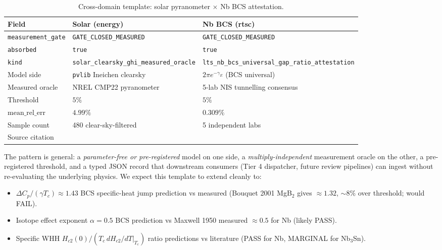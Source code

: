 \documentclass[11pt,a4paper]{article}
\newcommand{\gateclosedmeas}{\texttt{GATE\_CLOSED\_MEASURED}}
\begin{document}
\begin{table}[h]
\centering
\caption{Cross-domain template: solar pyranometer $\times$ Nb BCS attestation.}
\label{tab:cross-domain}
\small
\begin{tabular}{lll}
\toprule
Field & Solar (energy) & Nb BCS (rtsc) \\
\midrule
\texttt{measurement\_gate} & \gateclosedmeas & \gateclosedmeas \\
\texttt{absorbed} & \texttt{true} & \texttt{true} \\
\texttt{kind} & \texttt{solar\_clearsky\_ghi\_measured\_oracle}
        & \texttt{lts\_nb\_bcs\_universal\_gap\_ratio\_attestation} \\
Model side & \texttt{pvlib} Ineichen clearsky
        & \(2\pi e^{-\gamma_{E}}\) (BCS universal) \\
Measured oracle & NREL CMP22 pyranometer
        & 5-lab NIS tunnelling consensus \\
Threshold & \(5\%\) & \(5\%\) \\
\(\mathrm{mean\_rel\_err}\) & \(4.99\%\) & \(0.309\%\) \\
Sample count & 480 clear-sky-filtered & 5 independent labs \\
Source citation & \cite{nrelmidc,pvlib2024}
        & \cite{bcs1957,giaever1960,townsend1962,schwidtal1969,lichtenberg1989,tinkham1996} \\
\bottomrule
\end{tabular}
\end{table}

The pattern is general: a \emph{parameter-free or pre-registered}
model on one side, a \emph{multiply-independent} measurement oracle
on the other, a pre-registered threshold, and a typed JSON record
that downstream consumers (Tier 4 dispatcher, future review pipelines)
can ingest without re-evaluating the underlying physics. We expect
this template to extend cleanly to:
\begin{itemize}
\item \(\Delta C_{p}/(\gamma T_{c}) \approx 1.43\) BCS specific-heat
  jump prediction vs measured (Bouquet 2001 MgB$_2$ gives
  \(\approx 1.32\), \(\sim\!\!8\%\) over threshold; would FAIL).
\item Isotope effect exponent \(\alpha = 0.5\) BCS prediction vs Maxwell
  1950 measured \(\approx 0.5\) for Nb (likely PASS).
\item Specific WHH \(H_{c2}(0)/(T_{c}\,dH_{c2}/dT|_{T_c})\) ratio
  predictions vs literature (PASS for Nb, MARGINAL for Nb$_3$Sn).
\end{itemize}
\end{document}
